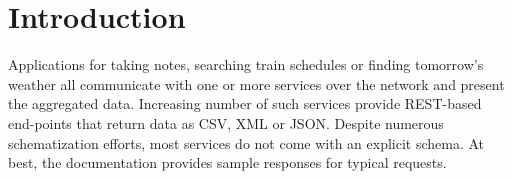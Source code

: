 \documentclass[10pt,preprint,clearpagebib]{sigplanconf}
\begin{document}
%
%

\section{Introduction}
\label{sec:introduction}

Applications for taking notes, searching train schedules or finding tomorrow's weather all 
communicate with one or more services over the network and present the aggregated data. 
Increasing number of such services provide REST-based end-points that return data as CSV, XML
or JSON. Despite numerous schematization efforts, most services do not come with an 
explicit schema. At best, the documentation provides sample responses for typical requests.
\end{document}
